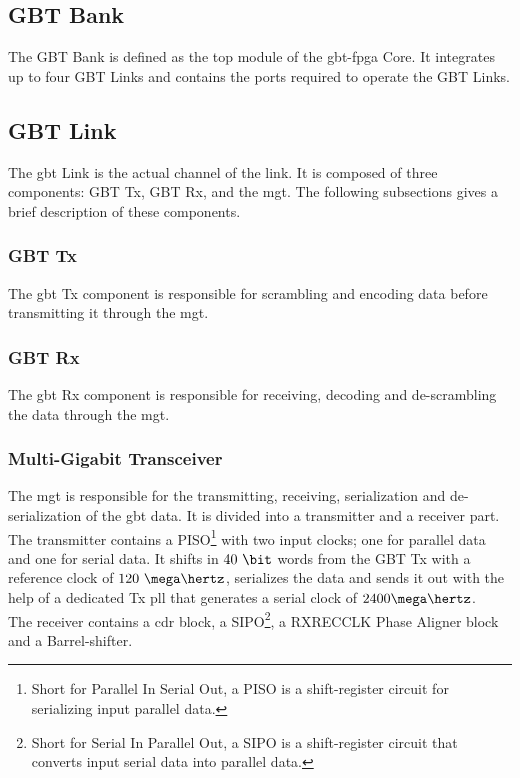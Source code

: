 \documentclass[main.tex]{subfiles}
\begin{document}
\subsection{GBT Bank}
The GBT Bank is defined as the top module of the \gls{gbt}-\gls{fpga} Core. It integrates up to four GBT Links and contains the ports required to operate the GBT Links.

\subsection{GBT Link}
The \gls{gbt} Link is the actual channel of the link. It is composed of three components: GBT Tx, GBT Rx, and the \gls{mgt}. The following subsections gives a brief description of these components.

\subsubsection{GBT Tx}

The \gls{gbt} Tx component is responsible for scrambling and encoding data before transmitting it through the \gls{mgt}.

\subsubsection{GBT Rx}

The \gls{gbt} Rx component is responsible for receiving, decoding and de-scrambling the data through the \gls{mgt}.

\subsubsection{Multi-Gigabit Transceiver}
The \gls{mgt} is responsible for the transmitting, receiving, serialization and de-serialization of the \gls{gbt} data. It is divided into a transmitter and a receiver part.\\ The transmitter contains a PISO\footnote{Short for Parallel In Serial Out, a PISO is a shift-register circuit for serializing input parallel data.} with two input clocks; one for parallel data and one for serial data. It shifts in $40~\bit$ words from the GBT Tx with a reference clock of $120~\mega\hertz$, serializes the data and sends it out with the help of a dedicated Tx \gls{pll} that generates a serial clock of $2400 \mega\hertz$.\\ The receiver contains a \gls{cdr} block, a SIPO\footnote{Short for Serial In Parallel Out, a SIPO is a shift-register circuit that converts input serial data into parallel data.}, a RXRECCLK Phase Aligner block and a Barrel-shifter. 



\end{document}
